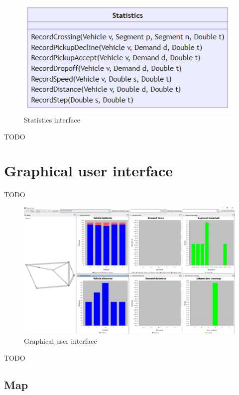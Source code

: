 \documentclass[11pt,twocolumn]{article}
\begin{document}
\begin{figure}[htbp]
    \includegraphics[width=\columnwidth]{../../diagrams/statistics/classes.png}
    \caption{Statistics interface}
    \label{fig:statistics-interface}
\end{figure}

TODO

\section{Graphical user interface}
\label{sec:gui}

TODO

\begin{figure}[htbp]
    \includegraphics[width=\columnwidth]{../../screenshots/basic-simulation.png}
    \caption{Graphical user interface}
    \label{fig:gui}
\end{figure}

TODO

\subsection{Map}
\end{document}
